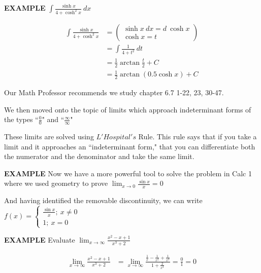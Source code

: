 \documentclass{article}
\begin{document}
\newpage

{\bf{}EXAMPLE} $\displaystyle\int\frac{\sinh x}{4+\cosh^2x}\ dx$

\begin{align*}
\int\frac{\sinh x}{4+\cosh^2x}&=\left(\begin{array}{l}
\sinh x\ dx=d\ \cosh x\\
\cosh x=t\end{array}\right)\\
&=\int\frac{1}{4+t^2}\ dt\\
&=\frac{1}{2}\arctan\frac{t}{2}+C\\
&=\frac{1}{2}\arctan(0.5\cosh x)+C
\end{align*}

\vspace{10pt}

Our Math Professor recommends we study chapter 6.7 1-22, 23, 30-47.

\vspace{10pt}

We then moved onto the topic of limits which approach indeterminant forms of the types ``$\frac{0}{0}$" and ``$\frac{\infty}{\infty}$"

\vspace{10pt}

These limits are solved using $L'Hospital's$ Rule. This rule says that if you take a limit and it approaches an ``indeterminant form," that you can differentiate both the numerator and the denominator and take the same limit.

\vspace{10pt}

{\bf{}EXAMPLE} Now we have a more powerful tool to solve the problem in Calc 1 where we used geometry to prove $\displaystyle\lim_{x\to0}\frac{\sin x}{x}=0$

\vspace{10pt}

And having identified the removable discontinuity, we can write $f(x)=\left\{\begin{array}{c}\frac{\sin x}{x};\ x\neq0\\1;\ x=0\end{array}\right.$

\vspace{10pt}

{\bf{}EXAMPLE} Evaluate $\displaystyle\lim_{x\to\infty}\frac{x^2-x+1}{x^3+2}$

\begin{align*}
\lim_{x\to\infty}\frac{x^2-x+1}{x^3+2}&=\lim_{x\to\infty}\frac{\frac{1}{x}-\frac{1}{x^2}+\frac{1}{x^3}}{1+\frac{2}{x^3}}=\frac{0}{1}=0
\end{align*}
\end{document}
